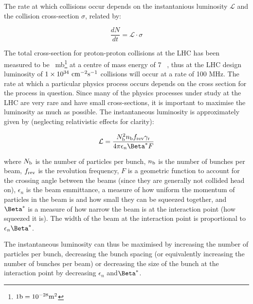 The rate at which collisions occur depends on the instantanious luminosity
$\mathcal{L}$ and the collision cross-section $\sigma$, related by:

\begin{equation}
\frac{dN}{dt} = \mathcal{L} \cdot \sigma
\end{equation}

The total cross-section for
proton-proton collisions at the LHC has been measured to be
~mb\footnote{$1 \rm{b} = 10^{-28}
m^{2}$} at a centre of mass energy of 7 \tev~\cite{0295-5075-96-2-21002}, thus
at the LHC design luminosity of $1 \times 10^{34}~\rm{cm}^{-2}\rm{s}^{-1}$
collisions will occur at a rate of 100 MHz. The rate at which a particular
physics process occurs depends on the cross section for the process in question.
Since many of the physics processes under study at the LHC are very rare and
have small cross-sections, it is important to maximise the luminosity as much as
possible. The instantaneous luminosity is approximately given by (neglecting relativistic
effects for clarity):

\begin{equation}
\mathcal{L} = \frac{N_{\rm{b}}^{2}n_{\rm{b}}f_{\rm{rev}}\gamma_{\rm{r}}}{4\pi
\epsilon_{n}\Beta^{*} F}
\end{equation}

where $N_{\rm{b}}$ is the number of particles per bunch, $n_{\rm{b}}$ is the
number of bunches per beam, $f_{\rm{rev}}$ is the revolution frequency, $F$ is a
geometric function to account for the crossing angle between the beams (since
they are generally not collided head on), $\epsilon_{n}$ is the beam emmittance,
a measure of how uniform the momentum of particles in the beam is and how small
they can be squeezed together, and $\Beta^{*}$ is a measure of how narrow the
beam is at the interaction point (how squeezed it is). The width of the beam at
the interaction point is proportional to $\epsilon_{n} \Beta^{*}$.

%

The instantaneous luminosity can thus be maximised by increasing the
number of particles per bunch, decreasing the bunch spacing (or equivalently
increasing the number of bunches per beam) or decreasing the size of the bunch
at the interaction point by decreasing $\epsilon_{n}$ and$\Beta^{*}$.

